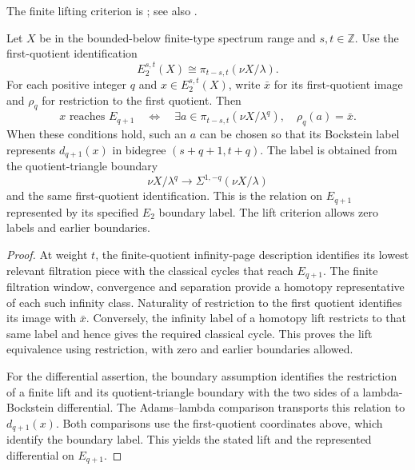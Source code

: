 \begin{theorem}
\label{sem:Literature:finite-bockstein}
The finite lifting criterion is \cite[Theorem 3.8]{LWX126}; see also
\cite[Theorem A.1(1) and Corollary A.11]{BHS}.\par

Let $X$ be in the bounded-below finite-type spectrum range and $s,t\in\mathbb Z$. Use the first-quotient identification
\[
 E_2^{s,t}(X)\cong\pi_{t-s,t}(\nu X/\lambda).
\]
For each positive integer $q$ and $x\in E_2^{s,t}(X)$, write $\bar x$ for its first-quotient image and $\rho_q$ for restriction to the first quotient. Then
\[
 x\text{ reaches }E_{q+1}
 \quad\Longleftrightarrow\quad
 \exists a\in\pi_{t-s,t}(\nu X/\lambda^q),\quad\rho_q(a)=\bar x.
\]
When these conditions hold, such an $a$ can be chosen so that its Bockstein label represents $d_{q+1}(x)$ in bidegree $(s+q+1,t+q)$. The label is obtained from the quotient-triangle boundary
\[
 \nu X/\lambda^q\longrightarrow\Sigma^{1,-q}(\nu X/\lambda)
\]
and the same first-quotient identification. This is the relation on $E_{q+1}$ represented by its specified $E_2$
boundary label. The lift criterion allows zero labels and earlier boundaries.

\end{theorem}
\begin{proof}
At weight $t$, the finite-quotient infinity-page description identifies
its lowest relevant filtration piece with the classical cycles that
reach $E_{q+1}$. The finite filtration window, convergence and separation
provide a homotopy representative of each such infinity class.
Naturality of restriction to the first quotient identifies its image
with $\bar x$. Conversely, the infinity
label of a homotopy lift restricts to that same label and hence gives
the required classical cycle. This proves the lift equivalence using
restriction, with zero and earlier boundaries allowed.

For the differential assertion, the boundary assumption identifies the
restriction of a finite lift and its quotient-triangle boundary with
the two sides of a lambda-Bockstein differential. The Adams--lambda
comparison transports this relation to $d_{q+1}(x)$. Both comparisons
use the first-quotient coordinates above, which
identify the boundary label. This yields the stated lift and the
represented differential on $E_{q+1}$.
\end{proof}

